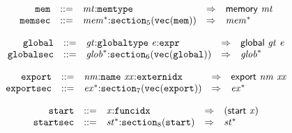 \vspace{1ex}

$$
\begin{array}{@{}l@{}rrlll@{}l@{}}
& {\mathtt{mem}} &::=& {\mathit{mt}}{:}{\mathtt{memtype}} &\Rightarrow& \mathsf{memory}~{\mathit{mt}} \\
& {\mathtt{memsec}} &::=& {{\mathit{mem}}^\ast}{:}{{\mathtt{section}}}_{5}({\mathtt{vec}}({\mathtt{mem}})) &\Rightarrow& {{\mathit{mem}}^\ast} \\
\end{array}
$$

\vspace{1ex}

$$
\begin{array}{@{}l@{}rrlll@{}l@{}}
& {\mathtt{global}} &::=& {\mathit{gt}}{:}{\mathtt{globaltype}}~{\mathit{e}}{:}{\mathtt{expr}} &\Rightarrow& \mathsf{global}~{\mathit{gt}}~{\mathit{e}} \\
& {\mathtt{globalsec}} &::=& {{\mathit{glob}}^\ast}{:}{{\mathtt{section}}}_{6}({\mathtt{vec}}({\mathtt{global}})) &\Rightarrow& {{\mathit{glob}}^\ast} \\
\end{array}
$$

\vspace{1ex}

$$
\begin{array}{@{}l@{}rrlll@{}l@{}}
& {\mathtt{export}} &::=& {\mathit{nm}}{:}{\mathtt{name}}~{\mathit{xx}}{:}{\mathtt{externidx}} &\Rightarrow& \mathsf{export}~{\mathit{nm}}~{\mathit{xx}} \\
& {\mathtt{exportsec}} &::=& {{\mathit{ex}}^\ast}{:}{{\mathtt{section}}}_{7}({\mathtt{vec}}({\mathtt{export}})) &\Rightarrow& {{\mathit{ex}}^\ast} \\
\end{array}
$$

\vspace{1ex}

$$
\begin{array}{@{}l@{}rrlll@{}l@{}}
& {\mathtt{start}} &::=& {\mathit{x}}{:}{\mathtt{funcidx}} &\Rightarrow& (\mathsf{start}~{\mathit{x}}) \\
& {\mathtt{startsec}} &::=& {{\mathit{st}}^\ast}{:}{{\mathtt{section}}}_{8}({\mathtt{start}}) &\Rightarrow& {{\mathit{st}}^\ast} \\
\end{array}
$$

\vspace{1ex}

